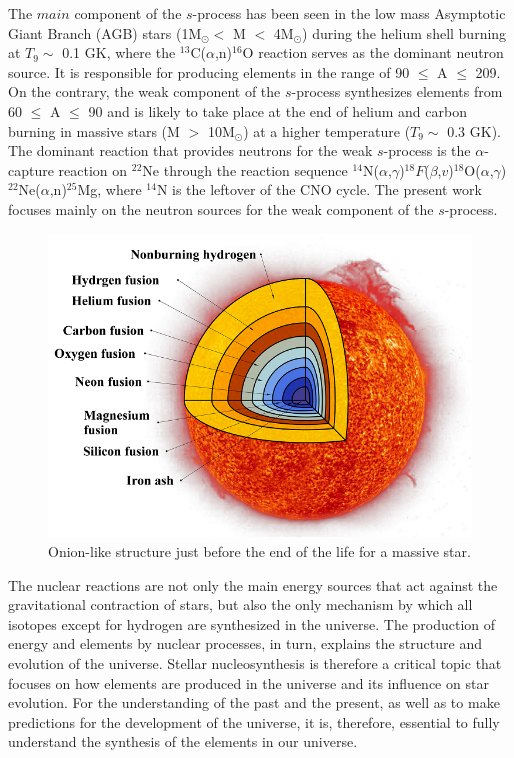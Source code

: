 The $main$ component of the $s$-process has been seen in the low mass Asymptotic Giant Branch (AGB) stars (1M$_{\odot}<$  M $<$ 4M$_{\odot}$) during the helium shell burning at $T_9 \sim$ 0.1 GK, where the  $^{13}$C($\alpha$,n)$^{16}$O reaction serves as the dominant
neutron source. It is responsible for producing elements
in the range of 90 $\leq$ A $\leq$ 209. On the contrary, the weak component of the  $s$-process
synthesizes elements from 60 $\leq$ A $\leq$ 90 and is likely to take
place at the end of helium and carbon burning in massive stars (M $>$ 10M$_{\odot}$) at a higher temperature ($T_9 \sim$ 0.3 GK).
The dominant reaction that provides neutrons
for the weak $s$-process is the $\alpha$-capture reaction on
$^{22}$Ne through the reaction sequence
$^{14}$N($\alpha$,$\gamma$)$^{18}F$($\beta$,$v$)$^{18}$O($\alpha$,$\gamma$)$^{22}$Ne($\alpha$,n)$^{25}$Mg, where $^{14}$N is the leftover of the CNO cycle. The present work focuses  mainly on the neutron sources for the weak component of the $s$-process.
\begin{figure}[tpb]
  \begin{center}
    \centerline{\includegraphics[scale=0.6]{graph/ch1/onion_1}}
    \caption{Onion-like structure just before the end of the life for a massive star.}
    \label{fig:onion}
  \end{center}
\end{figure}

The nuclear reactions are not only the main energy sources that act against the gravitational contraction of stars, but also the only mechanism by which all isotopes  except for hydrogen are synthesized in the universe. The production of energy and elements by nuclear processes, in turn, explains the structure and evolution of the universe. Stellar nucleosynthesis is therefore a  critical topic that focuses on how elements are produced in the universe and its influence on star evolution. For the understanding of the past and the present, as well as to make predictions for the development of the universe, it is, therefore, essential to fully understand the synthesis of the elements in our universe.


